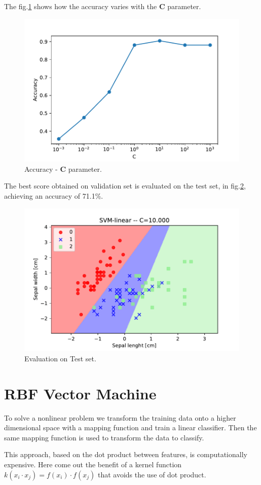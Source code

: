 \documentclass[10pt,a4paper]{article}
\begin{document}
The fig.\ref{fig:c_accuracy} shows how the accuracy varies with the \textbf{C} parameter.

\begin{figure}
	\centering
	\includegraphics[width=0.7\linewidth]{../Images/c_accuracy.pdf}
	\caption{Accuracy - \textbf{C} parameter.}
	\label{fig:c_accuracy}
\end{figure}

The best score obtained on validation set is evaluated on the test set, in fig.\ref{fig:lin_C10_best}, achieving an accuracy of 71.1\%.

\begin{figure}
\centering
\includegraphics[width=0.7\linewidth]{../Images/lin_C10_best.pdf}
\caption{Evaluation on Test set.}
\label{fig:lin_C10_best}
\end{figure}


\section{RBF Vector Machine}
To solve a nonlinear problem we transform the training data onto a higher dimensional space with a mapping function and train a linear classifier. Then the same mapping function is used to transform the data to classify.

This approach, based on the dot product between features, is computationally expensive. Here come out the benefit of a kernel function $k(x_i \cdot x_j)=f(x_i) \cdot f(x_j)$ that avoids the use of dot product.
\end{document}

